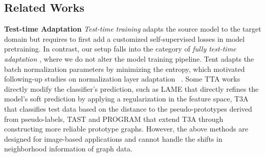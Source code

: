 \subsection{Related Works}
\textbf{Test-time Adaptation}
\emph{Test-time training} \cite{sun2020test, liu2021ttt, bartler2022mt3} adapts the source model to the target domain but requires to first add a customized self-supervised losses in model pretraining.
In contrast, our setup falls into the category of \emph{fully test-time adaptation} \cite{wang2020tent,liang2024comprehensive}, where we do not alter the model training pipeline.  %
 Tent \cite{wang2020tent} adapts the batch normalization parameters by minimizing the entropy, which motivated following-up studies on normalization layer adaptation
 ~\cite{gong2022note, zhao2023delta, lim2023ttn, niu2023towards}. 
Some TTA works directly modify the classifier's prediction, such as
 LAME \cite{boudiaf2022parameter} that directly refines the model's soft prediction by applying a regularization %
 in the feature space, 
T3A \cite{iwasawa2021test} that %
classifies test data based on the distance to the pseudo-prototypes derived from pseudo-labels, 
TAST \cite{jang2022test} and PROGRAM \cite{sunprogram} that extend T3A through constructing more reliable %
prototype graphs.
However, the above methods are designed for image-based applications and cannot handle the shifts in neighborhood information of graph data. %




